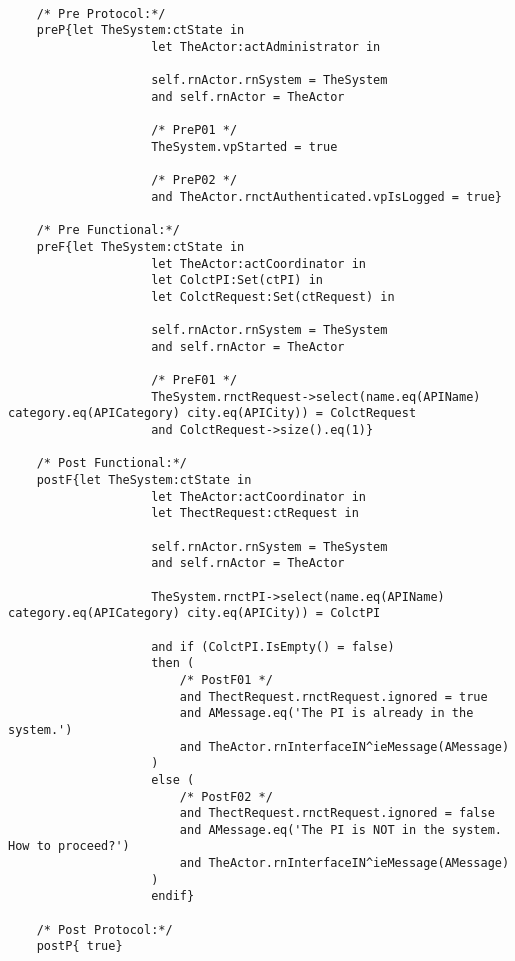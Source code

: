 	\scriptsize
	\vspace{0.5cm}
	\begin{lstlisting}[style=MessirStyle,firstnumber=auto,captionpos=b,caption={\msrmessir (MCL-oriented) specification of the operation \emph{oeCheckAvailability}.},label=OM-actCoordinator-oeCheckAvailability-MCL-LST]

	/* Pre Protocol:*/ 
	preP{let TheSystem:ctState in
					let TheActor:actAdministrator in
					
					self.rnActor.rnSystem = TheSystem
					and self.rnActor = TheActor
					
					/* PreP01 */
					TheSystem.vpStarted = true
					
					/* PreP02 */
					and TheActor.rnctAuthenticated.vpIsLogged = true}
	
	/* Pre Functional:*/
	preF{let TheSystem:ctState in
					let TheActor:actCoordinator in
					let ColctPI:Set(ctPI) in
					let ColctRequest:Set(ctRequest) in
					
					self.rnActor.rnSystem = TheSystem
					and self.rnActor = TheActor
					
					/* PreF01 */
					TheSystem.rnctRequest->select(name.eq(APIName) category.eq(APICategory) city.eq(APICity)) = ColctRequest
					and ColctRequest->size().eq(1)}
	
	/* Post Functional:*/ 
	postF{let TheSystem:ctState in
					let TheActor:actCoordinator in
					let ThectRequest:ctRequest in
					
					self.rnActor.rnSystem = TheSystem
					and self.rnActor = TheActor
					
					TheSystem.rnctPI->select(name.eq(APIName) category.eq(APICategory) city.eq(APICity)) = ColctPI
					
					and if (ColctPI.IsEmpty() = false)
					then (
						/* PostF01 */
						and ThectRequest.rnctRequest.ignored = true
						and AMessage.eq('The PI is already in the system.')
						and TheActor.rnInterfaceIN^ieMessage(AMessage)
					)
					else (
						/* PostF02 */
						and ThectRequest.rnctRequest.ignored = false
						and AMessage.eq('The PI is NOT in the system. How to proceed?')
						and TheActor.rnInterfaceIN^ieMessage(AMessage)
					)
					endif}
	
	/* Post Protocol:*/ 
	postP{ true}
	
	\end{lstlisting}
	\normalsize 
	
	
	
	






